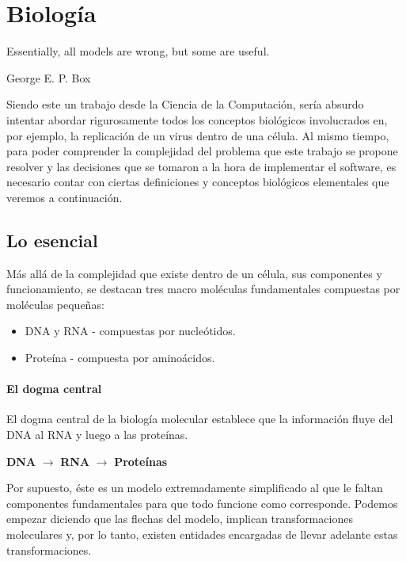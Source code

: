 \chapter{Biolog\'ia}
\label{biologia}
\epigraph{Essentially, all models are wrong, but some are useful.}%
{George E. P. Box}

Siendo este un trabajo desde la Ciencia de la Computaci\'on, ser\'ia absurdo
intentar abordar rigurosamente todos los conceptos biol\'ogicos involucrados
en, por ejemplo, la replicaci\'on de un virus dentro de una c\'elula. Al mismo
tiempo, para poder comprender la complejidad del problema que este trabajo se
propone resolver y las decisiones que se tomaron a la hora de implementar el
software, es necesario contar con ciertas definiciones y conceptos biol\'ogicos
elementales que veremos a continuaci\'on.

\section{Lo esencial}
\label{bio-esencial}

M\'as all\'a de la complejidad que existe dentro de un c\'elula, sus componentes
y funcionamiento, se destacan tres macro mol\'eculas fundamentales compuestas
por mol\'eculas peque\~nas:
\begin{itemize}
 \item \ac{DNA} y \ac{RNA} - compuestas por nucle\'otidos. 
 \item Prote\'ina - compuesta por amino\'acidos.
\end{itemize}

\subsubsection{El dogma central}

El dogma central de la biolog\'ia molecular establece que la informaci\'on
fluye del \ac{DNA} al \ac{RNA} y luego a las prote\'inas.
\begin{center}
 \textbf{DNA} $\longrightarrow$ \textbf{RNA} $\longrightarrow$
\textbf{Prote\'inas}
\end{center}

Por supuesto, \'este es un modelo extremadamente simplificado al que le faltan
componentes fundamentales para que todo funcione como corresponde. Podemos
empezar diciendo que las flechas del modelo, implican transformaciones
moleculares y, por lo tanto, existen entidades encargadas de llevar adelante
estas transformaciones. 

